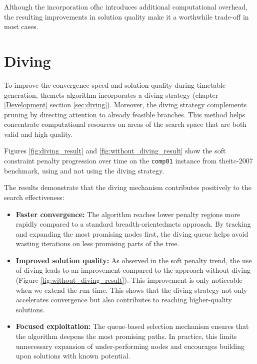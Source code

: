 Although the incorporation of\ac{hc} introduces additional computational overhead, the resulting improvements in solution quality make it a worthwhile trade-off in most cases.
   
\section{Diving}

To improve the convergence speed and solution quality during timetable generation, the\ac{mcts} algorithm incorporates a diving strategy (chapter \ref{Development} section \ref{sec:diving}). Moreover, the diving strategy complements pruning by directing attention to already feasible branches. This method helps concentrate computational resources on areas of the search space that are both valid and high quality.

Figures \ref{fig:diving_result} and \ref{fig:without_diving_result} show the soft constraint penalty progression over time on the \texttt{comp01} instance from the\ac{itc-2007} benchmark, using and not using the diving strategy.

The results demonstrate that the diving mechanism contributes positively to the search effectiveness:

\begin{itemize}
\item \textbf{Faster convergence:} The algorithm reaches lower penalty regions more rapidly compared to a standard breadth-oriented\ac{mcts} approach. By tracking and expanding the most promising nodes first, the diving queue helps avoid wasting iterations on less promising parts of the tree.

\item \textbf{Improved solution quality:} As observed in the soft penalty trend, the use of diving leads to an improvement compared to the approach without diving (Figure \ref{fig:without_diving_result}). This improvement is only noticeable when we extend the run time. This shows that the diving strategy not only accelerates convergence but also contributes to reaching higher-quality solutions.

\item \textbf{Focused exploitation:} The queue-based selection mechanism ensures that the algorithm deepens the most promising paths. In practice, this limits unnecessary expansion of under-performing nodes and encourages building upon solutions with known potential.
\end{itemize}

